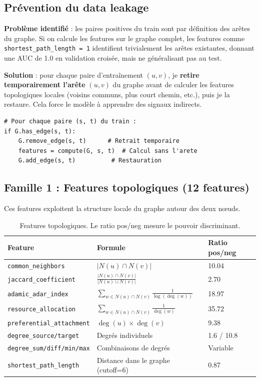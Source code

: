 \documentclass[12pt,a4paper]{article}
\begin{document}
\subsection{Prévention du data leakage}

\textbf{Problème identifié} : les paires positives du train sont par définition des arêtes du graphe. Si on calcule les features sur le graphe complet, les features comme \texttt{shortest\_path\_length = 1} identifient trivialement les arêtes existantes, donnant une AUC de 1.0 en validation croisée, mais ne généralisant pas au test.

\textbf{Solution} : pour chaque paire d'entraînement $(u, v)$, je \textbf{retire temporairement l'arête} $(u, v)$ du graphe avant de calculer les features topologiques locales (voisins communs, plus court chemin, etc.), puis je la restaure. Cela force le modèle à apprendre des signaux indirects.

\begin{lstlisting}[caption={Principe du retrait d'arête pour éviter le leakage}]
# Pour chaque paire (s, t) du train :
if G.has_edge(s, t):
    G.remove_edge(s, t)      # Retrait temporaire
    features = compute(G, s, t)  # Calcul sans l'arete
    G.add_edge(s, t)          # Restauration
\end{lstlisting}

\subsection{Famille 1 : Features topologiques (12 features)}

Ces features exploitent la structure locale du graphe autour des deux nœuds.

\begin{table}[H]
\centering
\small
\begin{tabular}{p{4.5cm}p{6cm}p{3cm}}
\toprule
\textbf{Feature} & \textbf{Formule} & \textbf{Ratio pos/neg} \\
\midrule
\texttt{common\_neighbors} & $|N(u) \cap N(v)|$ & 10.04 \\
\texttt{jaccard\_coefficient} & $\frac{|N(u) \cap N(v)|}{|N(u) \cup N(v)|}$ & 2.70 \\
\texttt{adamic\_adar\_index} & $\sum_{w \in N(u) \cap N(v)} \frac{1}{\log(\deg(w))}$ & 18.97 \\
\texttt{resource\_allocation} & $\sum_{w \in N(u) \cap N(v)} \frac{1}{\deg(w)}$ & 35.72 \\
\texttt{preferential\_attachment} & $\deg(u) \times \deg(v)$ & 9.38 \\
\texttt{degree\_source/target} & Degrés individuels & 1.6 / 10.8 \\
\texttt{degree\_sum/diff/min/max} & Combinaisons de degrés & Variable \\
\texttt{shortest\_path\_length} & Distance dans le graphe (cutoff=6) & 0.87 \\
\bottomrule
\end{tabular}
\caption{Features topologiques. Le ratio pos/neg mesure le pouvoir discriminant.}
\end{table}
\end{document}
